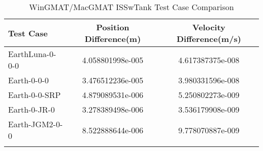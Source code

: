 \begin{table}[htbp!]
\centering
\caption{ WinGMAT/MacGMAT ISSwTank Test Case Comparison}
      \begin{tabular}{lcc}
      \hline\hline
          Test Case & Position Difference(m) & Velocity Difference(m/s) \\
         \hline
         EarthLuna-0-0-0 & 4.058801998e-005 & 4.617387375e-008 \\
         Earth-0-0-0 & 3.476512236e-005 & 3.980331596e-008 \\
         Earth-0-0-SRP & 4.879089531e-006 & 5.250802273e-009 \\
         Earth-0-JR-0 & 3.278389498e-006 & 3.536179908e-009 \\
         Earth-JGM2-0-0 & 8.522888644e-006 & 9.778070887e-009 \\
      \hline\hline
      \label{Table: ISSwTank WinGMAT-MacGMAT Table} 
\end{tabular}
\end{table}
